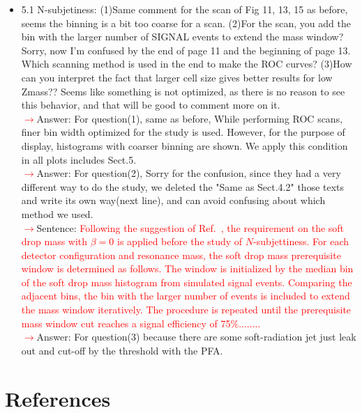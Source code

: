 \documentclass[final,1p,11pt]{elsarticle}
\begin{document}
\begin{itemize}
\item 5.1 N-subjetiness: (1)Same comment for the scan of Fig 11, 13, 15 as before, seems the binning is a bit too coarse for a scan. (2)For the scan, you add the bin with the larger number of SIGNAL events to extend the mass window? Sorry, now I'm confused by the end of page 11 and the beginning of page 13. Which scanning method is used in the end to make the ROC curves? (3)How can you interpret the fact that larger cell size gives better results for low Zmass?? Seems like something is not optimized, as there is no reason to see this behavior, and that will be good to comment more on it.\\
 \textcolor{red}{$\rightarrow$}Answer: For question(1), same as before, While performing ROC scans, finer bin width optimized for the study is used. However, for the purpose of display, histograms with coarser binning are shown. We apply this condition in all plots includes Sect.5.\\
 \textcolor{red}{$\rightarrow$}Answer: For question(2), Sorry for the confusion, since they had a very different way to do the study, we deleted the "Same as Sect.4.2" those texts and write its own way(next line), and can avoid confusing about which method we used.\\
 \textcolor{red}{$\rightarrow$}Sentence: \textcolor{red}{Following the suggestion of Ref.~\cite{Dreyer:2018tjj}, the requirement on the 
soft drop mass with $\beta=0$ is applied before the study of $N$-subjettiness. 
For each detector configuration and resonance mass, the soft drop mass prerequisite window is determined as follows. The window is initialized by the median bin of the soft drop mass histogram from simulated signal events. Comparing the adjacent bins, the bin with the larger number of events is included to extend the mass window iteratively. The procedure is repeated until the prerequisite mass window cut reaches a signal efficiency of 75\%........} \\
 \textcolor{red}{$\rightarrow$}Answer: For question(3) because there are some soft-radiation jet just leak out and cut-off by the threshold with the PFA.\\ 
\end{itemize}

\section*{References}


\def\bibname{\Large\bf References}
\def\refname{\Large\bf References}
\pagestyle{plain}

\end{document}
